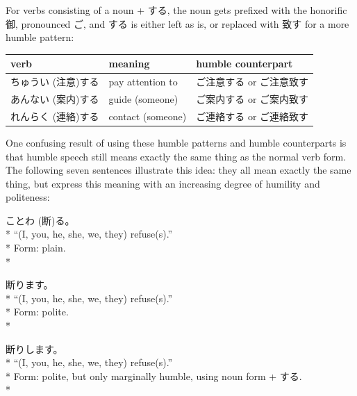 \documentclass[11pt, b5paper, twoside, openright, onecolumn]{book}
\makeatletter
\newcommand*{\rtrubystack}[2]{{\relscale{0.5}%
  \begin{tabular}[b]{@{}c@{}}%
    {#1}\\%
    {\textscale{2}{#2}}%
  \end{tabular}}%
}
\DeclareRobustCommand*{\rtruby}[2]{%
  \mbox{%
    \setlength{\parskip}{0ex}%
    \BeginAccSupp{method=pdfstringdef,ActualText={#1}}%
      \rtrubystack{\phantom{#2}}{#1}%
      \llap{%
        \rtrubystack{#2}{\phantom{#1}}%
      }%
    \EndAccSupp{}%
  }%
}
\newcommand*{\rubystack}[2]{{\relscale{0.5}%
  \begin{tabular}[b]{@{}c@{}}%
    {#1}\\%
   {\textscale{2}{#2}}%
  \end{tabular}}%
}
\DeclareRobustCommand*{\ruby}[2]{%
  \mbox{%
    \setlength{\parskip}{0ex}%
    \BeginAccSupp{method=pdfstringdef,ActualText={#1}}%
      \rubystack{\phantom{#2}}{#1}%
      \llap{%
        \rubystack{#2}{\phantom{#1}}%
      }%
    \EndAccSupp{}%
  }%
}
\renewcommand*{\rtruby}[2]{#2 (#1)}%
\renewcommand*{\ruby}[2]{#2 (#1)}%
\newenvironment{exampleblock}{
\setlength{\parindent}{0.6in}
\begin{minipage}[t]{\dimexpr\textwidth-\parindent}}
{\end{minipage}}
\newenvironment{mytabular}[1]{\noindent\hspace{0.4in}
\begin{tabular}[h]{#1}}{\end{tabular}}
\makeatother
\begin{document}
For verbs consisting of a noun + する‚ the noun gets prefixed with the honorific 御‚ pronounced ご‚ and する is either left as is‚ or replaced with 致す for a more humble pattern:

\vspace{0.5cm}
\smaller
\begin{mytabular}{| l  l  l |}\hline 
\rule{0pt}{2.4ex}verb & meaning & humble counterpart\\ 
\hline
\rule{0pt}{3.6ex}\rtruby{注意}{ちゅうい}する & pay attention to & ご注意する or ご注意致す\\ 
\rule{0pt}{3.6ex}\rtruby{案内}{あんない}する & guide (someone) & ご案内する or ご案内致す\\ 
\rule{0pt}{3.6ex}\rtruby{連絡}{れんらく}する & contact (someone) & ご連絡する or ご連絡致す\\ 
\hline 
\end{mytabular}
\larger
\vspace{0.5cm}


One confusing result of using these humble patterns and humble counterparts is that humble speech still means exactly the same thing as the normal verb form. The following seven sentences illustrate this idea: they all mean exactly the same thing‚ but express this meaning with an increasing degree of humility and politeness:

\vspace{0.4cm}
\begin{exampleblock}
\ruby{断}{ことわ}る。 \\* 
“(I‚ you‚ he‚ she‚ we‚ they) refuse(s).” \\* 
Form: plain. \\* 
\end{exampleblock}
\vspace{0.2cm}

\begin{exampleblock}
断ります。 \\* 
“(I‚ you‚ he‚ she‚ we‚ they) refuse(s).” \\* 
Form: polite. \\* 
\end{exampleblock}
\vspace{0.2cm}

\begin{exampleblock}
断りします。 \\* 
“(I‚ you‚ he‚ she‚ we‚ they) refuse(s).” \\* 
Form: polite‚ but only marginally humble‚ using noun form + する. \\* 
\end{exampleblock}
\vspace{0.2cm}
\end{document}
